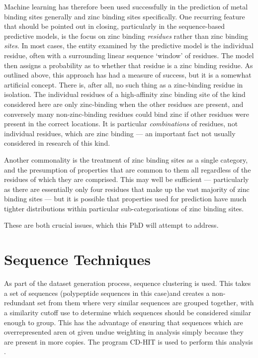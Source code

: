 Machine learning has therefore been used successfully in the prediction of metal binding sites generally and zinc binding sites specifically. One recurring feature that should be pointed out in closing, particularly in the sequence-based
predictive models, is the focus on zinc binding \emph{residues} rather
than zinc binding \emph{sites}. In most cases, the entity examined by the predictive model
is the individual residue, often with a surrounding linear sequence `window'
of residues. The model then assigns a probability as to whether that
residue is a zinc binding residue. As outlined above, this approach has 
had a measure of success, but it is a somewhat artificial
concept. There is, after all, no such thing as a zinc-binding residue
in isolation. The individual residues of a high-affinity zinc binding
site of the kind considered here are only zinc-binding when the other
residues are present, and conversely many non-zinc-binding residues
could bind zinc if other residues were present in the correct
locations. It is particular \emph{combinations} of residues, not individual
residues, which are zinc binding --- an important fact not usually
considered in research of this kind.

Another commonality is the treatment of zinc binding sites as a single
category, and the presumption of properties that are common to them
all regardless of the residues of which they are comprised. This may
well be sufficient --- particularly as there are essentially only four
residues that make up the vast majority of zinc binding sites --- but
it is possible that properties used for prediction have much tighter
distributions within particular sub-categorisations of zinc binding
sites.

These are both crucial issues, which this PhD will attempt to address.

\section{Sequence Techniques}

As part of the dataset generation process, sequence clustering is used. This takes a set of sequences (polypeptide sequences in this case)and creates a non-redundant set from them where very similar sequences are grouped together, with a similarity cutoff use to determine which sequences should be considered similar enough to group. This has the advantage of ensuring that sequences which are overrepresented aren ot given undue weighting in analysis simply because they are present in more copies. The program CD-HIT is used to perform this analysis \cite{li2006cdhit}.


